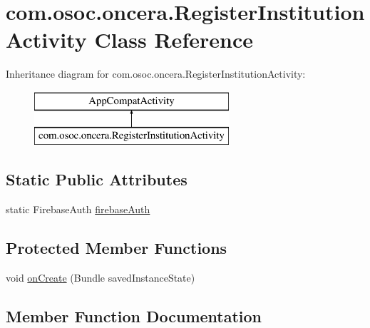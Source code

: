 \hypertarget{classcom_1_1osoc_1_1oncera_1_1_register_institution_activity}{}\section{com.\+osoc.\+oncera.\+Register\+Institution\+Activity Class Reference}
\label{classcom_1_1osoc_1_1oncera_1_1_register_institution_activity}
Inheritance diagram for com.\+osoc.\+oncera.\+Register\+Institution\+Activity\+:\begin{figure}[H]
\begin{center}
\leavevmode
\includegraphics[height=2.000000cm]{classcom_1_1osoc_1_1oncera_1_1_register_institution_activity}
\end{center}
\end{figure}
\subsection*{Static Public Attributes}
\begin{DoxyCompactItemize}
\item 
static Firebase\+Auth \mbox{\hyperlink{classcom_1_1osoc_1_1oncera_1_1_register_institution_activity_acfd58196c3907e4b23d903bc0fcd57fc}{firebase\+Auth}}
\end{DoxyCompactItemize}
\subsection*{Protected Member Functions}
\begin{DoxyCompactItemize}
\item 
void \mbox{\hyperlink{classcom_1_1osoc_1_1oncera_1_1_register_institution_activity_a6adf3ee40613ce86679d02ac1f41a0d9}{on\+Create}} (Bundle saved\+Instance\+State)
\end{DoxyCompactItemize}


\subsection{Member Function Documentation}
\mbox{\label{classcom_1_1osoc_1_1oncera_1_1_register_institution_activity_a6adf3ee40613ce86679d02ac1f41a0d9}} 
